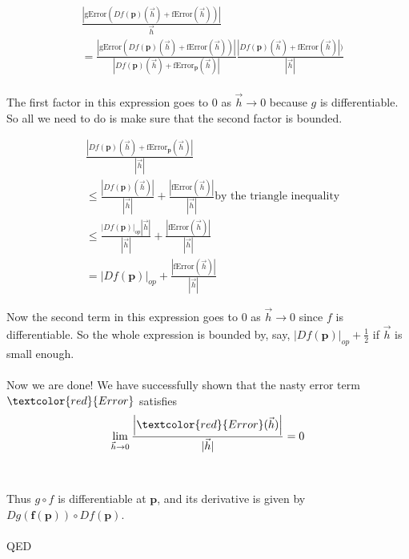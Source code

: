 \documentclass{ximera}
\begin{document}
\begin{align*}
& \frac{ \left| \text{gError}\left(Df(\mathbf{p})(\vec{h})+\text{fError}(\vec{h})\right)\right|}{\vec{h}}\\
&=\frac{\left| \text{gError}\left(Df(\mathbf{p})(\vec{h})+\text{fError}(\vec{h})\right)\right|}{\left|Df(\mathbf{p})(\vec{h})+\text{fError}_{\mathbf{p}}(\vec{h})\right|} \frac{\left|Df(\mathbf{p})(\vec{h})+\text{fError}(\vec{h})\right|)}{|\vec{h}|}\\
\end{align*}

The first factor in this expression goes to $0$ as $\vec{h} \to 0$ because $g$ is differentiable.  
So all we need to do is make sure that the second factor is bounded.

\begin{align*}
	&\frac{\left|Df(\mathbf{p})(\vec{h})+\text{fError}_{\mathbf{p}}(\vec{h})\right|}{|\vec{h}|} \\
	&\leq \frac{\left|Df(\mathbf{p})(\vec{h}) \right|}{|\vec{h}|}+ \frac{\left|\text{fError}(\vec{h})\right|}{|\vec{h}|} \text{by the triangle inequality}\\
	&\leq \frac{\left|Df(\mathbf{p})\right|_{op}\left|\vec{h}\right|}{|\vec{h}|}+ \frac{\left|\text{fError}(\vec{h})\right|}{|\vec{h}|}\\
	&= \left|Df(\mathbf{p})\right|_{op} + \frac{\left|\text{fError}(\vec{h})\right|}{|\vec{h}|}
\end{align*}

Now the second term in this expression goes to $0$ as $\vec{h} \to 0$ since $f$ is differentiable.  So the whole expression is bounded by, say, $|Df(\mathbf{p})|_{op}+\frac{1}{2}$
if $\vec{h}$ is small enough.  
\\
\\
Now we are done!  We have successfully shown that the nasty error term $\textcolor{red}{Error}$ 
satisfies \[\displaystyle\lim_{\vec{h} \to 0}\frac{\left|\textcolor{red}{Error}(\vec{h})\right|}{|\vec{h}|} = 0\]
\\
\\
Thus $g \circ f$ is differentiable at $\mathbf{p}$, and its derivative is given by $Dg(\mathbf{f(p)}) \circ Df(\mathbf{p})$.
\\
\\
QED


	
\end{document}
